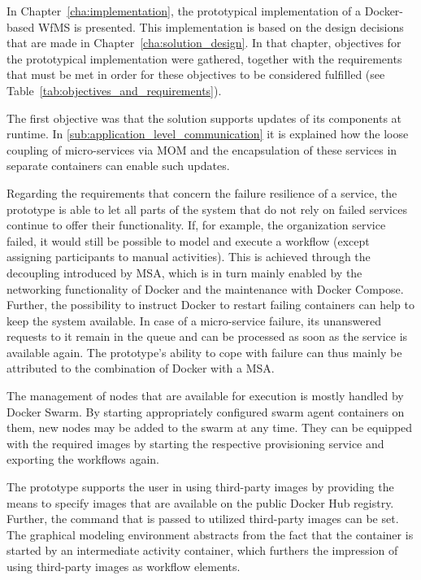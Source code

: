 
  In Chapter~\ref{cha:implementation}, the prototypical implementation of a Docker-based \ac{WfMS} is presented. This implementation is based on the design decisions that are made in Chapter~\ref{cha:solution_design}. In that chapter, objectives for the prototypical implementation were gathered, together with the requirements that must be met in order for these objectives to be considered fulfilled (see Table~\ref{tab:objectives_and_requirements}).

  The first objective was that the solution supports updates of its components at runtime.
  In \ref{sub:application_level_communication} it is explained how the loose coupling of micro-services via \ac{MOM} and the encapsulation of these services in separate containers can enable such updates.

  Regarding the requirements that concern the failure resilience of a service, the prototype is able to let all parts of the system that do not rely on failed services continue to offer their functionality. If, for example, the organization service failed, it would still be possible to model and execute a workflow (except assigning participants to manual activities). This is achieved through the decoupling introduced by \ac{MSA}, which is in turn mainly enabled by the networking functionality of Docker and the maintenance with Docker Compose. Further, the possibility to instruct Docker to restart failing containers can help to keep the system available. In case of a micro-service failure, its unanswered requests to it remain in the queue and can be processed as soon as the service is available again. The prototype's ability to cope with failure can thus mainly be attributed to the combination of Docker with a \ac{MSA}.

  The management of nodes that are available for execution is mostly handled by Docker Swarm. By starting appropriately configured swarm agent containers on them, new nodes may be added to the swarm at any time. They can be equipped with the required images by starting the respective provisioning service and exporting the workflows again.

  The prototype supports the user in using third-party images by providing the means to specify images that are available on the public Docker Hub registry. Further, the command that is passed to utilized third-party images can be set. The graphical modeling environment abstracts from the fact that the container is started by an intermediate activity container, which furthers the impression of using third-party images as workflow elements.

